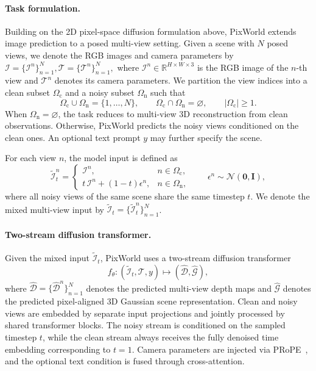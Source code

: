 \paragraph{Task formulation.}
Building on the 2D pixel-space diffusion formulation above, PixWorld extends image prediction to a posed multi-view setting. Given a scene with $N$ posed views, we denote the RGB images and camera parameters by
$
\mathcal{I}=\{\mathcal{I}^n\}_{n=1}^{N},
\mathcal{T}=\{\mathcal{T}^n\}_{n=1}^{N},
$
where $\mathcal{I}^n\in\mathbb{R}^{H\times W\times 3}$ is the RGB image of the $n$-th view and $\mathcal{T}^n$ denotes its camera parameters. We partition the view indices into a clean subset $\Omega_{\mathrm c}$ and a noisy subset $\Omega_{\mathrm n}$ such that
\begin{equation}
\Omega_{\mathrm c}\cup\Omega_{\mathrm n}=\{1,\dots,N\},
\qquad
\Omega_{\mathrm c}\cap\Omega_{\mathrm n}=\varnothing,
\qquad
|\Omega_{\mathrm c}|\ge 1.
\label{eq:clean_noisy_partition}
\end{equation}
When $\Omega_{\mathrm n}=\varnothing$, the task reduces to multi-view 3D reconstruction from clean observations. Otherwise, PixWorld predicts the noisy views conditioned on the clean ones. An optional text prompt $y$ may further specify the scene.

For each view $n$, the model input is defined as
\begin{equation}
\tilde{\mathcal{I}}_t^n=
\begin{cases}
\mathcal{I}^n, & n\in\Omega_{\mathrm c},\\[2pt]
t\,\mathcal{I}^n+(1-t)\epsilon^n, & n\in\Omega_{\mathrm n},
\end{cases}
\qquad
\epsilon^n\sim\mathcal{N}(\mathbf 0,\mathbf I),
\label{eq:mixed_input}
\end{equation}
where all noisy views of the same scene share the same timestep $t$. We denote the mixed multi-view input by $\tilde{\mathcal{I}}_t=\{\tilde{\mathcal{I}}_t^n\}_{n=1}^{N}$.

\paragraph{Two-stream diffusion transformer.}
Given the mixed input $\tilde{\mathcal{I}}_t$, PixWorld uses a two-stream diffusion transformer
\begin{equation}
f_\theta : (\tilde{\mathcal{I}}_t,\mathcal{T},y)\mapsto (\hat{\mathcal{D}},\hat{\mathcal{G}}),
\label{eq:pixworld_mapping}
\end{equation}
where $\hat{\mathcal{D}}=\{\hat{\mathcal{D}}^n\}_{n=1}^{N}$ denotes the predicted multi-view depth maps and $\hat{\mathcal{G}}$ denotes the predicted pixel-aligned 3D Gaussian scene representation. Clean and noisy views are embedded by separate input projections and jointly processed by shared transformer blocks. The noisy stream is conditioned on the sampled timestep $t$, while the clean stream always receives the fully denoised time embedding corresponding to $t=1$. Camera parameters are injected via PRoPE~\citep{li2025cameras}, and the optional text condition is fused through cross-attention.

